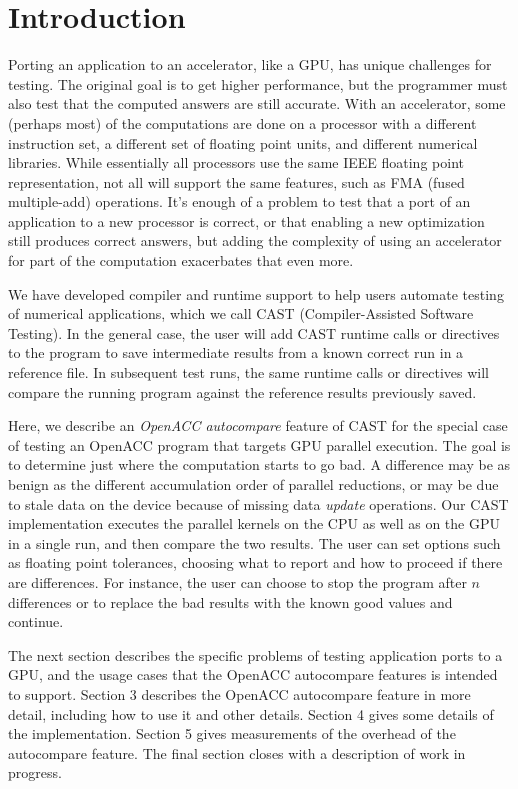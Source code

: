 \section{Introduction}

Porting an application to an accelerator, like a GPU, has unique challenges for testing.
The original goal is to get higher performance, but the programmer must also test that the computed answers are still accurate.
With an accelerator, some (perhaps most) of the computations are done on a processor with a different instruction set, a different set of floating point units, and different numerical libraries.
While essentially all processors use the same IEEE floating point representation, not all will support the same features, such as FMA (fused multiple-add) operations.
It's enough of a problem to test that a port of an application to a new processor is correct, or that enabling a new optimization still produces correct answers, but adding the complexity of using an accelerator for part of the computation exacerbates that even more.

We have developed compiler and runtime support to help users automate testing of numerical applications, which we call CAST (Compiler-Assisted Software Testing).
In the general case, the user will add CAST runtime calls or directives to the program to save intermediate results from a known correct run in a reference file.
In subsequent test runs, the same runtime calls or directives will compare the running program against the reference results previously saved.

Here, we describe an \emph{OpenACC autocompare} feature of CAST for the special case of testing an OpenACC\cite{openacc.16} program that targets GPU parallel execution.
The goal is to determine just where the computation starts to go bad.
A difference may be as benign as the different accumulation order of parallel reductions, or may be due to stale data on the device because of missing data \emph{update} operations.
Our CAST implementation executes the parallel kernels on the CPU as well as on the GPU in a single run, and then compare the two results.
The user can set options such as floating point tolerances, choosing what to report and how to proceed if there are differences.
For instance, the user can choose to stop the program after $n$ differences or to replace the bad results with the known good values and continue.

The next section describes the specific problems of testing application ports to a GPU, and the usage cases that the OpenACC autocompare features is intended to support.
Section 3 describes the OpenACC autocompare feature in more detail, including how to use it and other details.
Section 4 gives some details of the implementation.
Section 5 gives measurements of the overhead of the autocompare feature.
The final section closes with a description of work in progress.

